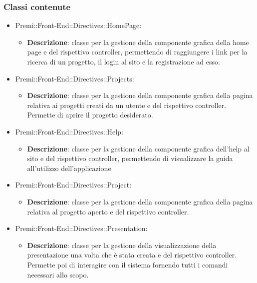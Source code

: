 \subsubsection*{Classi contenute}
\begin{itemize}
	\item Premi::Front-End::Directives::HomePage:
	\begin{itemize}
		\item \textbf{Descrizione}: classe per la gestione della componente grafica della home page e del rispettivo controller, permettendo di raggiungere i link per la ricerca di un progetto, il login al sito e la registrazione ad esso.
	\end{itemize}

    \item Premi::Front-End::Directives::Projects:
	\begin{itemize}
		\item \textbf{Descrizione}: classe per la gestione della componente grafica della pagina relativa ai progetti creati da un utente e del rispettivo controller. Permette di aprire il progetto desiderato.
	\end{itemize}

    \item Premi::Front-End::Directives::Help:
	\begin{itemize}
		\item \textbf{Descrizione}: classe per la gestione della componente grafica dell'help al sito e del rispettivo controller, permettendo di visualizzare la guida all'utilizzo dell'applicazione
	\end{itemize}

    \item Premi::Front-End::Directives::Project:
	\begin{itemize}
		\item \textbf{Descrizione}: classe per la gestione della componente grafica della pagina relativa al progetto aperto e del rispettivo controller.
	\end{itemize}

    \item Premi::Front-End::Directives::Presentation:
	\begin{itemize}
		\item \textbf{Descrizione}: classe per la gestione della visualizzazione della presentazione una volta che è stata creata e del rispettivo controller. Permette poi di interagire con il sistema fornendo tutti i comandi necessari allo scopo.
	\end{itemize}


\end{itemize}
